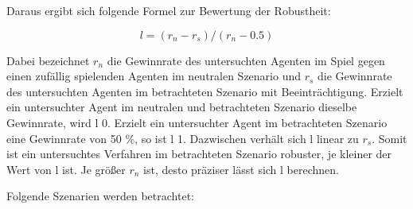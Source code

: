 Daraus ergibt sich folgende Formel zur Bewertung der Robustheit:

\[l = (r_n - r_s) / (r_n - 0.5)\]

Dabei bezeichnet $r_n$ die Gewinnrate des untersuchten Agenten im Spiel gegen einen zufällig spielenden Agenten im neutralen Szenario und $r_s$ die Gewinnrate des untersuchten Agenten im betrachteten Szenario mit Beeinträchtigung. Erzielt ein untersuchter Agent im neutralen und betrachteten Szenario dieselbe Gewinnrate, wird l 0. Erzielt ein untersuchter Agent im betrachteten Szenario eine Gewinnrate von 50 \%, so ist l 1. Dazwischen verhält sich l linear zu $r_s$. Somit ist ein untersuchtes Verfahren im betrachteten Szenario robuster, je kleiner der Wert von l ist. Je größer $r_n$ ist, desto präziser lässt sich l berechnen.

Folgende Szenarien werden betrachtet:

